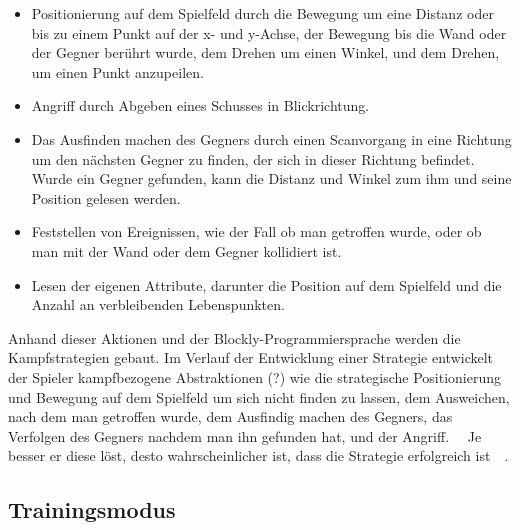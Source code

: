 \begin{itemize}
\item Positionierung auf dem Spielfeld durch die Bewegung um eine Distanz oder bis zu einem Punkt
auf der x- und y-Achse, der Bewegung bis die Wand oder der Gegner berührt wurde, dem Drehen um einen
Winkel, und dem Drehen, um einen Punkt anzupeilen.
\item Angriff durch Abgeben eines Schusses in Blickrichtung.
\item Das Ausfinden machen des Gegners durch einen Scanvorgang in eine Richtung um den nächsten Gegner
  zu finden, der sich in dieser Richtung befindet. Wurde ein Gegner gefunden, kann die Distanz und
  Winkel zum ihm und seine Position gelesen werden.
\item Feststellen von Ereignissen, wie der Fall ob man getroffen wurde, oder ob man mit der Wand oder dem
Gegner kollidiert ist.
\item Lesen der eigenen Attribute, darunter die Position auf dem Spielfeld und die Anzahl an
verbleibenden Lebenspunkten.
\end{itemize}

Anhand dieser Aktionen und der Blockly-Programmiersprache werden die Kampfstrategien gebaut. Im
Verlauf der Entwicklung einer Strategie entwickelt der Spieler kampfbezogene Abstraktionen (?) wie die
strategische Positionierung und Bewegung auf dem Spielfeld um sich nicht finden zu lassen, dem
Ausweichen, nach dem man getroffen wurde, dem Ausfindig machen des Gegners, das Verfolgen des
Gegners nachdem man ihn gefunden hat, und der Angriff. ~~Je besser er diese löst, desto
wahrscheinlicher ist, dass die Strategie erfolgreich ist~~.


\subsection{Trainingsmodus}


